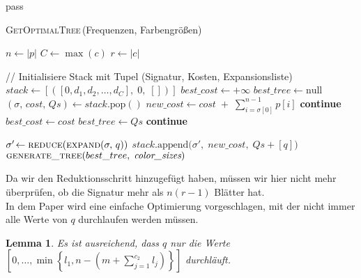 pass\documentclass[a4paper,10pt,ngerman]{scrartcl}
\newtheorem{lemma}[satz]{Lemma}
\begin{document}
    \begin{algorithm} [H]
        \caption{\textsc{GetOptimalTree}\,(Frequenzen, Farbengrößen)}
        \begin{algorithmic}[1]
                \State $n \gets |p|$  
                \State $C \gets \max(c)$ 
                \State $r \gets |c|$  

                \State // Initialisiere Stack mit Tupel (Signatur, Kosten, Expansionsliste)
                \State $stack \gets [([0, d_1, d_2, \dots, d_C],\;0,\;[])]$
                \State $best\_cost \gets +\infty$
                \State $best\_tree \gets \text{null}$
                    \State $(\sigma,\,cost,\,Qs) \gets stack.\mathrm{pop}()$
                    \State $new\_cost \gets cost \;+\;\sum_{i=\sigma[0]}^{n-1} p[i]$
                        \State \textbf{continue}
                    \EndIf
                            \State $best\_cost \gets cost$
                            \State $best\_tree \gets Qs$
                        \EndIf
                        \State \textbf{continue}
                    \EndIf

                        \State $\sigma'\!\gets \textsc{reduce}(\textsc{expand}(\sigma,\,q))$
                        \State $stack.\mathrm{append}\bigl(\sigma',\;new\_cost,\;Qs + [q]\bigr)$
                    \EndFor
                \EndWhile
                \State \Return $\textsc{generate\_tree}(best\_tree,\;\textit{color\_sizes})$
            \EndFunction
        \end{algorithmic}\label{alg:algorithm}
    \end{algorithm}
    Da wir den Reduktionsschritt hinzugefügt haben, müssen wir hier nicht mehr überprüfen, ob die Signatur mehr als $n (r - 1)$ Blätter hat. \\
    In dem Paper\autocite{golin_dynamic_1998} wird eine einfache Optimierung vorgeschlagen, mit der nicht immer alle Werte von $q$ durchlaufen werden müssen.
    \begin{lemma}
        \label{lem:reader_1}
        Es ist ausreichend, dass $q$ nur die Werte $\left[0, \dots, \min\left\{l_1, n - \left(m + \sum^{c_2}_{j=1} l_j\right)\right\}\right]$ durchläuft.
    \end{lemma}
\end{document}
